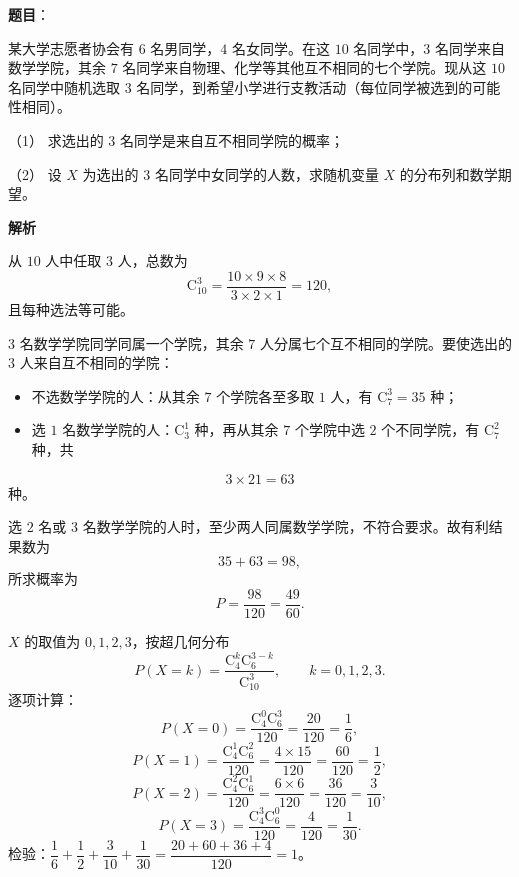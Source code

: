 \begin{answer}

\textbf{题目}：

某大学志愿者协会有 $6$ 名男同学，$4$ 名女同学。在这 $10$ 名同学中，$3$ 名同学来自数学学院，其余 $7$ 名同学来自物理、化学等其他互不相同的七个学院。现从这 $10$ 名同学中随机选取 $3$ 名同学，到希望小学进行支教活动（每位同学被选到的可能性相同）。

（1） 求选出的 $3$ 名同学是来自互不相同学院的概率；

（2） 设 $X$ 为选出的 $3$ 名同学中女同学的人数，求随机变量 $X$ 的分布列和数学期望。

\textbf{解析}

从 $10$ 人中任取 $3$ 人，总数为
\nopagebreak[4]
\[\mathrm C_{10}^3=\frac{10\times9\times8}{3\times2\times1}=120,\]
且每种选法等可能。


$3$ 名数学学院同学同属一个学院，其余 $7$ 人分属七个互不相同的学院。要使选出的 $3$ 人来自互不相同的学院：

\begin{itemize}
\item 不选数学学院的人：从其余 $7$ 个学院各至多取 $1$ 人，有 $\mathrm C_7^3=35$ 种；
\item 选 $1$ 名数学学院的人：$\mathrm C_3^1$ 种，再从其余 $7$ 个学院中选 $2$ 个不同学院，有 $\mathrm C_7^2$ 种，共
\end{itemize}
\nopagebreak[4]
\[3\times21=63\]
种。

选 $2$ 名或 $3$ 名数学学院的人时，至少两人同属数学学院，不符合要求。故有利结果数为
\nopagebreak[4]
\[35+63=98,\]
所求概率为
\nopagebreak[4]
\[P=\frac{98}{120}=\frac{49}{60}.\]


$X$ 的取值为 $0,1,2,3$，按超几何分布
\nopagebreak[4]
\[P(X=k)=\frac{\mathrm C_4^k\mathrm C_6^{3-k}}{\mathrm C_{10}^3},\qquad k=0,1,2,3.\]
逐项计算：
\nopagebreak[4]
\[P(X=0)=\frac{\mathrm C_4^0\mathrm C_6^3}{120}=\frac{20}{120}=\frac16,\]
\nopagebreak[4]
\[P(X=1)=\frac{\mathrm C_4^1\mathrm C_6^2}{120}=\frac{4\times15}{120}=\frac{60}{120}=\frac12,\]
\nopagebreak[4]
\[P(X=2)=\frac{\mathrm C_4^2\mathrm C_6^1}{120}=\frac{6\times6}{120}=\frac{36}{120}=\frac3{10},\]
\nopagebreak[4]
\[P(X=3)=\frac{\mathrm C_4^3\mathrm C_6^0}{120}=\frac{4}{120}=\frac1{30}.\]
检验：$\dfrac16+\dfrac12+\dfrac3{10}+\dfrac1{30}=\dfrac{20+60+36+4}{120}=1$。


\end{answer}
